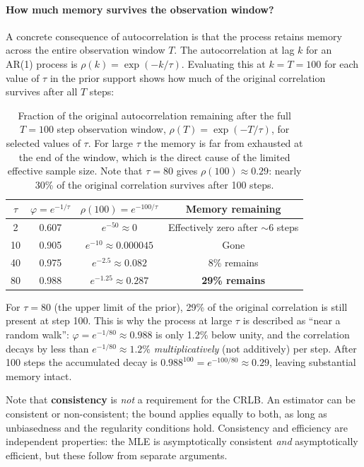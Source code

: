 \documentclass[11pt, a4paper]{article}
\begin{document}
\paragraph{How much memory survives the observation window?}
A concrete consequence of autocorrelation is that the process retains memory
across the entire observation window $T$.
The autocorrelation at lag $k$ for an AR(1) process is
$\rho(k) = \exp(-k/\tau)$.
Evaluating this at $k = T = 100$ for each value of $\tau$ in the prior support
shows how much of the original correlation survives after all $T$ steps:

\begin{table}[h]
\centering
\caption{Fraction of the original autocorrelation remaining after the full
$T = 100$ step observation window, $\rho(T) = \exp(-T/\tau)$, for selected
values of $\tau$.
For large $\tau$ the memory is far from exhausted at the end of the window,
which is the direct cause of the limited effective sample size.
Note that $\tau = 80$ gives $\rho(100) \approx 0.29$: nearly 30\% of the
original correlation survives after 100 steps.}
\label{tab:memory_survival}
\renewcommand{\arraystretch}{1.4}
\begin{tabular}{cccc}
\hline
$\tau$ & $\varphi = e^{-1/\tau}$ &
$\rho(100) = e^{-100/\tau}$ &
Memory remaining \\
\hline
2  & 0.607 & $e^{-50} \approx 0$        & Effectively zero after $\sim$6 steps \\
10 & 0.905 & $e^{-10} \approx 0.000045$ & Gone \\
40 & 0.975 & $e^{-2.5} \approx 0.082$   & 8\% remains \\
80 & 0.988 & $e^{-1.25} \approx 0.287$  & \textbf{29\% remains} \\
\hline
\end{tabular}
\end{table}

\noindent For $\tau = 80$ (the upper limit of the prior), 29\% of the original
correlation is still present at step 100.
This is why the process at large $\tau$ is described as ``near a random walk'':
$\varphi = e^{-1/80} \approx 0.988$ is only 1.2\% below unity, and the
correlation decays by less than $e^{-1/80} \approx 1.2\%$ \emph{multiplicatively}
(not additively) per step.
After 100 steps the accumulated decay is $0.988^{100} = e^{-100/80} \approx 0.29$,
leaving substantial memory intact.

Note that \textbf{consistency} is \emph{not} a requirement for the CRLB.
An estimator can be consistent or non-consistent; the bound applies equally to both,
as long as unbiasedness and the regularity conditions hold.
Consistency and efficiency are independent properties: the MLE is asymptotically
consistent \emph{and} asymptotically efficient, but these follow from separate
arguments.
\end{document}
